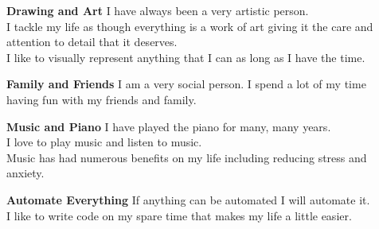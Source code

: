 
\begin{cvparagraph}

\begin{description}
  \item[] \textbf{Drawing and Art} \newline
  I have always been a very artistic person. \\
  I tackle my life as though everything is a work of art giving it the care and attention to detail that it deserves. \\
  I like to visually represent anything that I can as long as I have the time.
  \item[] \textbf{Family and Friends} \newline
  I am a very social person.  I spend a lot of my time having fun with my friends and family.
  \item[] \textbf{Music and Piano} \newline
  I have played the piano for many, many years. \\
  I love to play music and listen to music. \\
  Music has had numerous benefits on my life including reducing stress and anxiety.
  \item[] \textbf{Automate Everything} \newline
  If anything can be automated I will automate it. \\
  I like to write code on my spare time that makes my life a little easier.
\end{description}
\end{cvparagraph}
